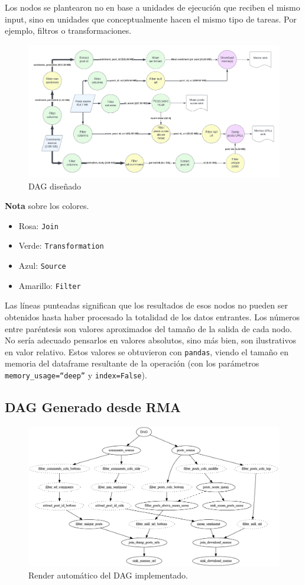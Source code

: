 \documentclass[titlepage,a4paper,oneside]{article}
\begin{document}
Los nodos se plantearon no en base a unidades de ejecución que reciben el mismo input, sino en unidades que conceptualmente hacen el mismo tipo de tareas. Por ejemplo, filtros o transformaciones.

\begin{figure}[H]
\centering
\includegraphics[width=\textwidth]{images/DAG.png}
\caption{DAG diseñado}
\end{figure}

\textbf{Nota} sobre los colores.
\begin{itemize}
	\item Rosa: \texttt{Join}
	\item Verde: \texttt{Transformation}
	\item Azul: \texttt{Source}
	\item Amarillo: \texttt{Filter}
\end{itemize}

Las líneas punteadas significan que los resultados de esos nodos no pueden ser obtenidos hasta haber procesado la totalidad de los datos entrantes. Los números entre paréntesis son valores aproximados del tamaño de la salida de cada nodo. No sería adecuado pensarlos en valores absolutos, sino más bien, son ilustrativos en valor relativo. Estos valores se obtuvieron con \texttt{pandas}, viendo el tamaño en memoria del dataframe resultante de la operación (con los parámetros \texttt{memory\_usage=``deep''} y \texttt{index=False}).

\subsection{DAG Generado desde RMA}
\begin{figure}[H]
\centering
\includegraphics[width=\textwidth]{images/DAG.gv.png}
\caption{Render automático del DAG implementado.}
\end{figure}
\end{document}
